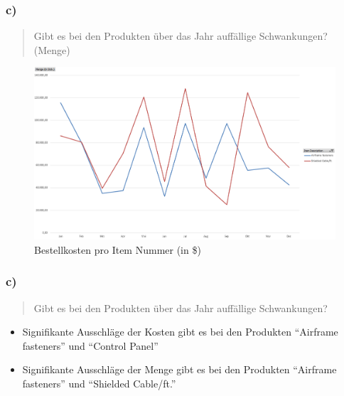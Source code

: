 \documentclass{beamer}
\begin{document}
\begin{frame}
\frametitle{c)}

\begin{quote}
Gibt es bei den Produkten über das Jahr auff\"allige Schwankungen? (Menge)
\end{quote}

\begin{figure}
\includegraphics[scale=0.34]{pivot_itemNO_quantity2.PNG}
\caption{Bestellkosten pro Item Nummer (in \$)}
\end{figure}

\end{frame}

\begin{frame}
\frametitle{c)}

\begin{quote}
Gibt es bei den Produkten über das Jahr auff\"allige Schwankungen?
\end{quote}

\begin{itemize}
\setlength{\itemsep}{30pt}
\item Signifikante Ausschl\"age der Kosten gibt es bei den Produkten ``Airframe fasteners'' und ``Control Panel''
\item Signifikante Ausschl\"age der Menge gibt es bei den Produkten ``Airframe fasteners'' und ``Shielded Cable/ft.''
\end{itemize}

\end{frame}
\end{document}
